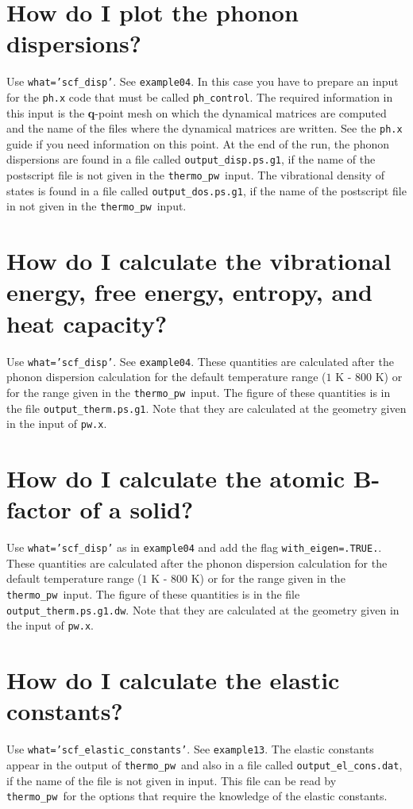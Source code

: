 \documentclass[12pt,a4paper]{article}
\def\thermo{\texttt{thermo\_pw}}
\begin{document}
\newpage
\section{\color{coral}How do I plot the phonon dispersions?}
Use \texttt{what='scf\_disp'}. See \texttt{example04}. In this case you
have to prepare an input for the \texttt{ph.x} code that must be
called \texttt{ph\_control}. The required information in this input
is the {\bf q}-point mesh on which the dynamical matrices are computed
and the name of the files where the dynamical matrices are written.
See the \texttt{ph.x} guide if you need information on this point.
At the end of the run, the phonon dispersions are found in a file 
called \texttt{output\_disp.ps.g1},
if the name of the postscript file is not given in the \thermo\ input.
The vibrational density of states is found in a file called 
\texttt{output\_dos.ps.g1}, if the name of the postscript file in not
given in the \thermo\ input.

\newpage
\section{\color{coral}How do I calculate the vibrational energy, 
free energy, entropy, and heat capacity?}
Use \texttt{what='scf\_disp'}. See \texttt{example04}. These quantities
are calculated after the phonon dispersion calculation for the default 
temperature range ($1$ K - $800$ K) or for the range
given in the \thermo\ input. The figure of these quantities is in the file 
\texttt{output\_therm.ps.g1}.
Note that they are calculated at the geometry given in the input
of \texttt{pw.x}.

\newpage
\section{\color{coral}How do I calculate the atomic B-factor of a solid?}
Use \texttt{what='scf\_disp'} as in \texttt{example04} and add the
flag \texttt{with\_eigen=.TRUE.}. These quantities
are calculated after the phonon dispersion calculation for the default 
temperature range ($1$ K - $800$ K) or for the range
given in the \thermo\ input. The figure of these quantities is in the file 
\texttt{output\_therm.ps.g1.dw}.
Note that they are calculated at the geometry given in the input
of \texttt{pw.x}.

\newpage
\section{\color{coral}How do I calculate the elastic constants?}
Use \texttt{what='scf\_elastic\_constants'}. See \texttt{example13}. The
elastic constants appear in the output of \thermo\ and also in a file
called \texttt{output\_el\_cons.dat}, if the name of the file is not
given in input. This file can be read by \thermo\ for the options
that require the knowledge of the elastic constants.
\end{document}
